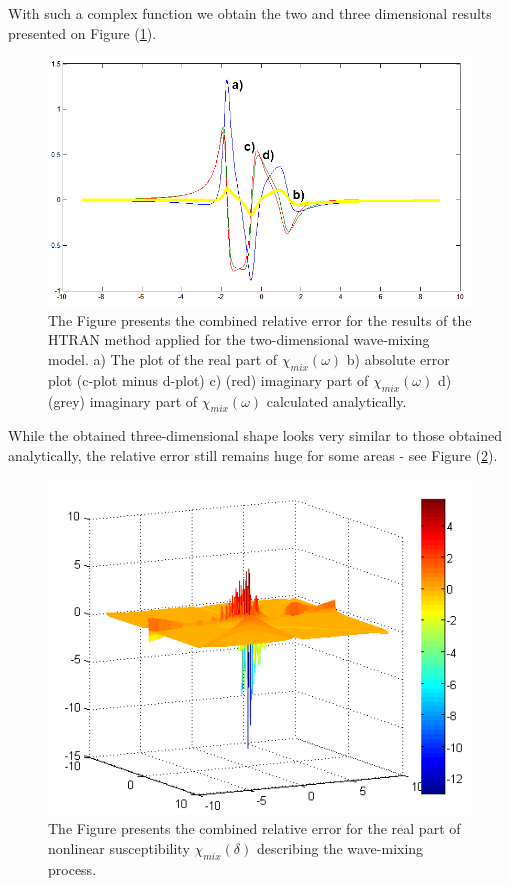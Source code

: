 \documentclass[12pt,twoside,a4paper]{article}
\numberwithin{equation}{subsection}
\numberwithin{figure}{subsection}
\begin{document}
With such a complex function we obtain the two and three dimensional results presented on Figure (\ref{fig:htran_mix_2d}).
 
\begin{figure}
  \includegraphics[width=150mm]{img/htran_fmix_2d.png}
  \caption{The Figure presents the combined relative error for the results of the HTRAN method applied for the
  two-dimensional wave-mixing model.
   a) The plot of the real part of ${\chi_{mix}}(\omega )$
   b) absolute error plot (c-plot minus d-plot)
   c) (red) imaginary part of  ${\chi_{mix}}(\omega )$
   d) (grey) imaginary part of ${\chi_{mix}}(\omega )$ calculated analytically.
   \label{fig:htran_mix_2d} }
\end{figure}

While the obtained three-dimensional shape looks very similar to those obtained analytically, the relative error still remains huge for some
areas - see Figure (\ref{fig:htran_fmix_3derr}).

\begin{figure}
  \begin{center}
    \includegraphics{img/htran_fmix_3derr.png}
    \caption{The Figure presents the combined relative error for the real part of nonlinear susceptibility
    ${\chi_{mix}}(\delta )$ describing the wave-mixing process. \label{fig:htran_fmix_3derr}}
  \end{center}    
\end{figure}
\end{document}

